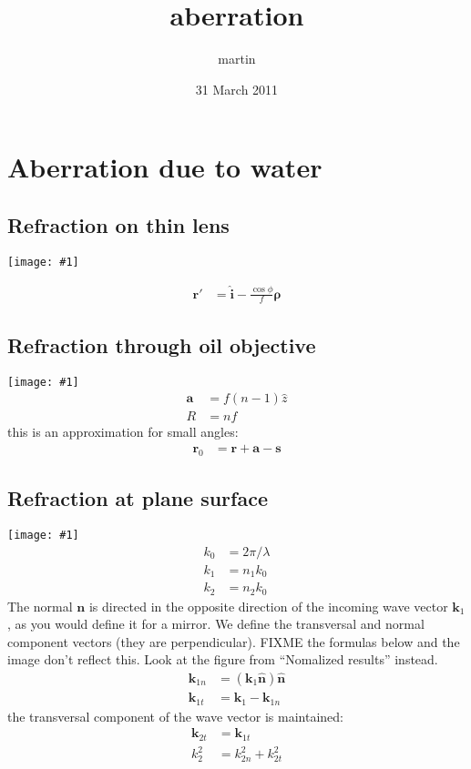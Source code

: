 \documentclass[11pt]{article}
\title{aberration}
\author{martin}
\date{31 March 2011}
\begin{document}
\maketitle

\setcounter{tocdepth}{3}
\tableofcontents
\vspace*{1cm}

\newcommand{\vect}[1]{\mathbf{#1}}
\renewcommand{\r}{\vect r}
\renewcommand{\a}{\vect a}
\newcommand{\s}{\vect s}
\renewcommand{\k}{\vect k}

\newcommand{\nvect}[1]{\vect{\hat{#1}}}
\renewcommand{\i}{\nvect i}
\newcommand{\n}{\nvect n}
\renewcommand{\t}{\nvect t}
\newcommand{\m}{\nvect m}
\newcommand{\vrho}{\vect\rho}
\newcommand{\bild}[1]{\texttt{[image: \#1]}}
\section{Aberration due to water}
\subsection{Refraction on thin lens}
\bild{thin-lens.jpg}

\begin{align}
  \r'&=\i- \frac{\cos\phi}{f} \vrho
\end{align}
\subsection{Refraction through oil objective}
\bild{objective.jpg}
\begin{align}
  \a &= f (n-1) \hat z \\
  R &= nf
\end{align}
this is an approximation for small angles: 
\begin{align}
  \r_0 &= \r + \a - \s
\end{align}
\subsection{Refraction at plane surface}
\bild{slab.jpg}
\begin{align}
  k_0&=2\pi/\lambda\\
  k_1&=n_1 k_0\\
  k_2&=n_2 k_0
\end{align}
The normal $\vect{n}$ is directed in the opposite direction of the incoming
wave vector $\k_1$, as you would define it for a mirror. We define the
transversal and normal component vectors (they are perpendicular). FIXME the formulas below and the image don't reflect this. Look at the figure from ``Nomalized results'' instead.
\begin{align}
  \k_{1n}&=(\k_1\n)\n\\ 
  \k_{1t}&=\k_1 - \k_{1n}
\end{align}
the transversal component of the wave vector is maintained:
\begin{align}
  \k_{2t}&=\k_{1t}\\
  k_2^2&=k_{2n}^2 + k_{2t}^2
\end{align}
\end{document}
